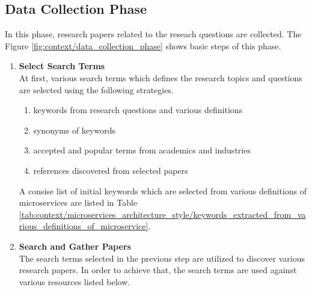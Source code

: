 \begin{enumerate}
\subsection{Data Collection Phase}\label{section:context/approach/data_collection_phase}
In this phase, research papers related to the reseach questions are collected. The Figure \ref{fig:context/data_collection_phase} shows basic steps of this phase.

\begin{enumerate}
\item \textbf{Select Search Terms}\\
At first, various search terms which defines the research topics and questions are selected using the following strategies.
\begin{enumerate}
\item keywords from research questions and various definitions
\item synonyms of keywords
\item accepted and popular terms from academics and industries
\item references discovered from selected papers
\end{enumerate}
A consise list of initial keywords which are selected from various definitions of microservices are listed in Table \ref{tab:context/microservices_architecture_style/keywords_extracted_from_various_definitions_of_microservice}.
\item \textbf{Search and Gather Papers}\\
The search terms selected in the previous step are utilized to discover various research papers. In order to achieve that, the search terms are used against various resources listed below.

\end{enumerate}
\end{enumerate}
